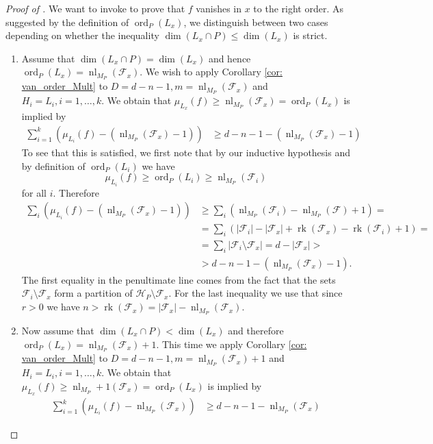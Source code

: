 \documentclass[a4paper,10pt]{amsart}
\theoremstyle{definition}
\theoremstyle{plain}
\newcommand{\ord}{\operatorname{ord}}
\newcommand{\rk}{\operatorname{rk}}
\newcommand{\nl}{\operatorname{nl}}
\newcommand{\cF}{{\mathcal F}}
\newcommand{\cH}{{\mathcal H}}
\begin{document}
\begin{proof}[Proof of ]
We want to invoke  to prove that $f$ vanishes in $x$ to the right order. As suggested by the definition of $\ord_P(L_x)$, we distinguish between two cases depending on whether the inequality $\dim(L_x\cap P)\leq \dim (L_x)$ is strict.
\begin{enumerate}
    \item Assume that $\dim(L_x\cap P)= \dim (L_x)$ and hence $\ord_P(L_x)=\nl_{M_P}(\cF_x)$. We wish to apply Corollary \ref{cor: van_order_Mult} to $D=d-n-1,m=\nl_{M_P}(\cF_x)$ and $H_i=L_i, i=1,\ldots,k$. We obtain that $\mu_{L_x}(f)\geq \nl_{M_P}(\cF_x)=\ord_P(L_x)$ is implied by 
    \begin{equation*}
    \begin{split}
        \sum_{i=1}^k \left(\mu_{L_i}(f) - (\nl_{M_P}(\cF_x) - 1)\right) &\geq d-n-1 - (\nl_{M_P}(\cF_x) - 1)
    \end{split}
    \end{equation*}
    To see that this is satisfied, we first note that by our inductive hypothesis and by definition of $\ord_P(L_i)$ we have
    \begin{equation*}
        \mu_{L_i}(f) \geq \ord_P(L_i) \geq \nl_{M_P}(\cF_i) 
    \end{equation*}
    for all $i$. Therefore
    \begin{equation*}
    \begin{split}
        \sum_i \left( \mu_{L_i}(f) - (\nl_{M_P}(\cF_x) - 1) \right) &\geq \sum_i \left( \nl_{M_P}(\cF_i) - \nl_{M_P}(\cF) + 1 \right) = \\
        &= \sum_i \left(|\cF_i| - |\cF_x| + \rk(\cF_x) - \rk(\cF_i) + 1\right) = \\
        &= \sum_i |\cF_i \setminus \cF_x| = d  - |\cF_x| > \\
        &> d - n - 1 - (\nl_{M_P}(\cF_x) - 1).
    \end{split}
    \end{equation*}
    The first equality in the penultimate line comes from the fact that the sets $\cF_i\setminus \cF_x$ form a partition of $\cH_P\setminus \cF_x$. For the last inequality we use that since $r > 0$ we have $n > \rk(\cF_x) = |\cF_x| - \nl_{M_P}(\cF_x)$.
    
    \item Now assume that $\dim(L_x\cap P)< \dim (L_x)$ and therefore $\ord_P(L_x)=\nl_{M_P}(\cF_x)+1$. This time we apply Corollary \ref{cor: van_order_Mult} to $D=d-n-1,m=\nl_{M_P}(\cF_x)+1$ and $H_i=L_i, i=1,\ldots,k$. We obtain that $\mu_{L_x}(f)\geq \nl_{M_P}+1(\cF_x)=\ord_P(L_x)$ is implied by 
    \begin{equation*}
    \begin{split}
        \sum_{i=1}^k \left(\mu_{L_i}(f) - \nl_{M_P}(\cF_x)\right) &\geq d-n-1 - \nl_{M_P}(\cF_x)
    \end{split}
    \end{equation*}


\end{enumerate}
\end{proof}
\end{document}
